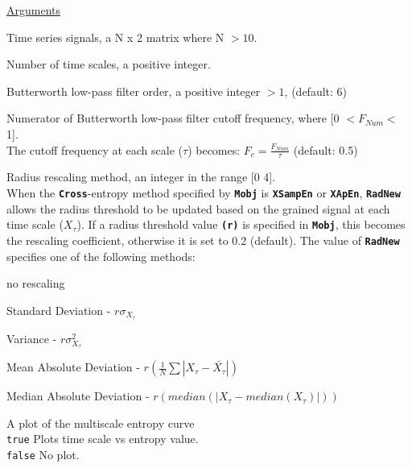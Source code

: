 \documentclass[12pt, a4paper, titlepage, openany]{book}
\begin{document}
\noindent \ul{Arguments}
\begin{description}[labelsep=1cm, labelwidth=2cm, nosep, style=multiline,leftmargin=3cm]\footnotesize
\item[\texttt{Sig}]		Time series signals, a N x 2 matrix where N $> 10$.
\item[\texttt{Scales}]		Number of time scales, a positive integer.
\item[\texttt{F\_Order}]	 Butterworth low-pass filter order, a positive integer $ > 1$, (default: 6) 
\item[\texttt{F\_Num}]	 Numerator of Butterworth low-pass filter cutoff frequency, where [0 $ <  F_{Num} < $ 1]. \\
The cutoff frequency at each scale ($\tau$) becomes: $F_{c} = \frac{F_{Num}}{\tau}$  (default: 0.5)
\item[\texttt{RadNew}]			Radius rescaling method, an integer in the range [0 4].\\
				 When the \texttt{\textbf{Cross}}-entropy method specified by \texttt{\textbf{Mobj}} is \texttt{\textbf{XSampEn}} or \texttt{\textbf{XApEn}}, \texttt{\textbf{RadNew}} allows the radius threshold to be updated based on the grained signal at each time scale ($X_\tau$). If a radius threshold value \texttt{\textbf{(r)}} is specified in \texttt{\textbf{Mobj}},  this becomes the rescaling coefficient, otherwise it is set to 0.2 (default). The value of \texttt{\textbf{RadNew}} specifies one of the following methods:
	\begin{description}[labelsep=5em, labelwidth=4em, nosep,style=multiline,leftmargin=2cm]
		\item[0]	no rescaling
		\item[1]    Standard Deviation          - $r\sigma_{X_\tau}$
        \item[2]    Variance                    - $r\sigma_{X_\tau}^2$
        \item[3]    Mean Absolute Deviation     - $r(\frac{1}{N} \sum |X_{\tau} - \bar{X_{\tau}}|) $
        \item[4]    Median Absolute Deviation   - $r(median(|X_{\tau} - median(X_{\tau})|)) $\\
	\end{description}
\item[\texttt{Plotx}]		A plot of the multiscale entropy curve\\
							\texttt{true} \hspace{15pt} Plots time scale vs entropy value.\\
							\texttt{false}\hspace{12pt} No plot.\\ \ \\

\end{description}
\end{document}
